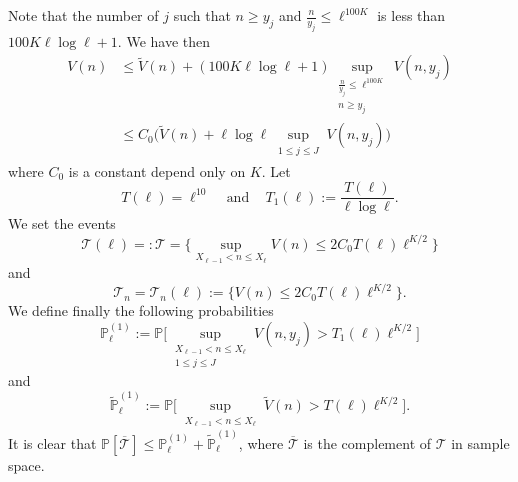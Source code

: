 \documentclass{article}
\begin{document}
Note that the number of $j$ such that $n\geqslant y_j$ and $\frac{n}{y_{j}} \leqslant \ell^{100K}$ is less than $100K \ell \log \ell+1$. We have then 
$$
\begin{aligned}\label{majoration_de_V}
    V(n) & \leqslant \widetilde{V}(n) + (100K \ell \log \ell+1) \sup_{\substack{ \frac{n}{y_{j}} \leqslant \ell^{100K} \\ n \geqslant y_j}}  V(n,y_{j}) 
    \\ & \leqslant C_0\bigg(  \widetilde{V}(n)+ \ell \log \ell \sup_{\substack{ 1\leqslant j\leqslant J}}  V(n,y_{j}) \bigg)
\end{aligned}
$$
where $C_0$ is a constant depend only on $K$. Let 
\begin{equation}\label{T(ell)_chapter2}
    T(\ell) =\ell^{10} \,\,\,\,\,\text{ and }\,\,\,\,\, T_1(\ell):= \frac{T(\ell)}{\ell \log\ell}.
\end{equation}
We set the events
\begin{equation}\label{event_T}
    \mathcal{T}(\ell)=:\mathcal{T} = \bigg\{ \sup_{ X_{\ell-1}<n \leqslant X_{\ell}}  V(n) \leqslant 2C_0T(\ell)\ell^{K/2} \bigg\}
\end{equation}
and
\begin{equation}\label{event_T_n}
    \mathcal{T}_n=\mathcal{T}_n(\ell) := \bigg\{   V(n) \leqslant 2C_0T(\ell)\ell^{K/2} \bigg\}.
\end{equation}
We define finally the following probabilities
\begin{equation}\label{probability_star}
    \mathbb{P}^{(1)}_{\ell} := \mathbb{P}\bigg[ \sup_{\substack{ X_{\ell-1} < n\leqslant X_{\ell} \\1 \leqslant j\leqslant J }} V(n,y_j)> T_1(\ell)\ell^{K/2}  \bigg]
\end{equation}
and
\begin{equation}\label{probability_tilde}
    \widetilde{\mathbb{P}}^{(1)}_{\ell} := \mathbb{P}\bigg[ \sup_{\substack{ X_{\ell-1} < n\leqslant X_{\ell} }} \widetilde{V}(n) > T(\ell)\ell^{K/2}  \bigg].
\end{equation}
It is  clear that $ \mathbb{P}[\overline{\mathcal{T}}] \leqslant \mathbb{P}^{(1)}_{\ell}  +\widetilde{\mathbb{P}}^{(1)}_{\ell}$, where $ \overline{\mathcal{T}}$ is the complement of $ \mathcal{T}$ in sample space.
\end{document}
